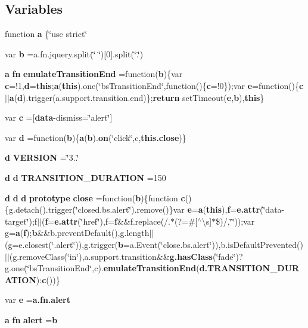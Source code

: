 \subsection*{Variables}
\begin{DoxyCompactItemize}
\item 
function {\bf a} \{\char`\"{}use strict\char`\"{}
\item 
var {\bf b} =a.\+fn.\+jquery.\+split(\char`\"{} \char`\"{})[0].split(\char`\"{}.\char`\"{})
\item 
{\bf a} {\bf fn} {\bf emulate\+Transition\+End} =function({\bf b})\{var {\bf c}=!1,{\bf d}={\bf this};{\bf a}({\bf this}).one(\char`\"{}bs\+Transition\+End\char`\"{},function()\{{\bf c}=!0\});var {\bf e}=function()\{{\bf c}$\vert$$\vert${\bf a}({\bf d}).trigger(a.\+support.\+transition.\+end)\};{\bf return} set\+Timeout({\bf e},{\bf b}),{\bf this}\}
\item 
var {\bf c} =\textquotesingle{}[{\bf data}-\/dismiss=\char`\"{}alert\char`\"{}]\textquotesingle{}
\item 
var {\bf d} =function({\bf b})\{{\bf a}({\bf b}).{\bf on}(\char`\"{}click\char`\"{},c,{\bf this.\+close})\}
\item 
{\bf d} {\bf V\+E\+R\+S\+I\+O\+N} =\char`\"{}3..\char`\"{}
\item 
{\bf d} {\bf d} {\bf T\+R\+A\+N\+S\+I\+T\+I\+O\+N\+\_\+\+D\+U\+R\+A\+T\+I\+O\+N} =150
\item 
{\bf d} {\bf d} {\bf d} {\bf prototype} {\bf close} =function({\bf b})\{function {\bf c}()\{g.\+detach().trigger(\char`\"{}closed.\+bs.\+alert\char`\"{}).remove()\}var {\bf e}={\bf a}({\bf this}),{\bf f}={\bf e.\+attr}(\char`\"{}data-\/target\char`\"{});f$\vert$$\vert$({\bf f}={\bf e.\+attr}(\char`\"{}href\char`\"{}),f={\bf f}\&\&f.\+replace(/.$\ast$(?=\#[$^\wedge$\textbackslash{}s]$\ast$\$)/,\char`\"{}\char`\"{}));var g={\bf a}({\bf f});{\bf b}\&\&b.\+prevent\+Default(),g.\+length$\vert$$\vert$(g=e.\+closest(\char`\"{}.alert\char`\"{})),g.\+trigger({\bf b}=a.\+Event(\char`\"{}close.\+bs.\+alert\char`\"{})),b.\+is\+Default\+Prevented()$\vert$$\vert$(g.\+remove\+Class(\char`\"{}in\char`\"{}),a.\+support.\+transition\&\&{\bf g.\+has\+Class}(\char`\"{}fade\char`\"{})?g.\+one(\char`\"{}bs\+Transition\+End\char`\"{},c).{\bf emulate\+Transition\+End}({\bf d.\+T\+R\+A\+N\+S\+I\+T\+I\+O\+N\+\_\+\+D\+U\+R\+A\+T\+I\+O\+N})\+:{\bf c}())\}
\item 
var {\bf e} ={\bf a.\+fn.\+alert}
\item 
{\bf a} {\bf fn} {\bf alert} ={\bf b}
\item 

\end{DoxyCompactItemize}
